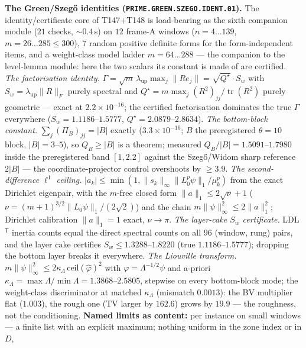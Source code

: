\par\smallskip\noindent\textbf{The Green/Szeg\H{o} identities
(\texttt{PRIME.GREEN.SZEGO.IDENT.01}).}
The identity/certificate core of T147+T148 is load-bearing as the sixth
companion module ($21$ checks, ${\sim}0.4$\,s) on $12$ frame-A windows
($n=4\ldots139$, $m=26\ldots285\le300$), $7$ random positive definite forms
for the form-independent items, and a weight-class model ladder
$m=64\ldots288$ --- the companion to the level-lemma module: here the two
scalars its constant is made of are certified.
\emph{The factorisation identity.}
$\Gamma=\sqrt m\,\lambda_{\mathrm{up}}\max_j\|Re_j\|=\sqrt{Q^\star}\cdot S_w$
with $S_w=\lambda_{\mathrm{up}}\|R\|_F$ purely spectral and
$Q^\star=m\max_j(R^2)_{jj}/\operatorname{tr}(R^2)$ purely geometric ---
exact at $2.2\times10^{-16}$; the certified factorisation dominates the true
$\Gamma$ everywhere ($S_w=1.1186$--$1.5777$, $Q^\star=2.0879$--$2.8634$).
\emph{The bottom-block constant.} $\sum_j(\Pi_B)_{jj}=|B|$ exactly
($3.3\times10^{-16}$; $B$ the preregistered $\theta=10$ block, $|B|=3$--$5$),
so $Q_B\ge|B|$ is a theorem; measured $Q_B/|B|=1.5091$--$1.7980$ inside the
preregistered band $[1,2.2]$ against the Szeg\H{o}/Widom sharp reference
$2|B|$ --- the coordinate-projector control overshoots by $\ge3.9$.
\emph{The second-difference $\ell^1$ ceiling.}
$|a_k|\le\min(1,\|s_k\|_\infty\|L_0^p\psi\|_1/\mu_k^p)$ from the exact
Dirichlet eigenpair, with the $m$-free closed form $\|a\|_1\le2\sqrt\nu+1$
($\nu=(m+1)^{3/2}\|L_0\psi\|_1/(2\sqrt2)$) and the chain
$m\|\psi\|_\infty^2\le2\|a\|_1^2$; Dirichlet calibration $\|a\|_1=1$ exact,
$\nu\to\pi$.
\emph{The layer-cake $S_w$ certificate.} LDL$^{\mathsf T}$ inertia counts
equal the direct spectral counts on all $96$ (window, rung) pairs, and the
layer cake certifies $S_w\le1.3288$--$1.8220$ (true $1.1186$--$1.5777$);
dropping the bottom layer breaks it everywhere.
\emph{The Liouville transform.}
$m\|\psi\|_\infty^2\le2\kappa_\Lambda\,\mathrm{ceil}(\hat\varphi)^2$ with
$\varphi=\Lambda^{-1/2}\psi$ and a-priori
$\kappa_\Lambda=\max\Lambda/\min\Lambda=1.3868$--$2.5805$, stepwise on every
bottom-block mode; the weight-class discriminator at matched $\kappa_\Lambda$
(mismatch $0.0013$): the BV multiplier flat ($1.003$), the rough one
($\mathrm{TV}$ larger by $162.6$) grows by $19.9$ --- the roughness, not the
conditioning.
\textbf{Named limits as content:} per instance on small windows --- a finite
list with an explicit maximum; nothing uniform in the zone index or in $D$,
